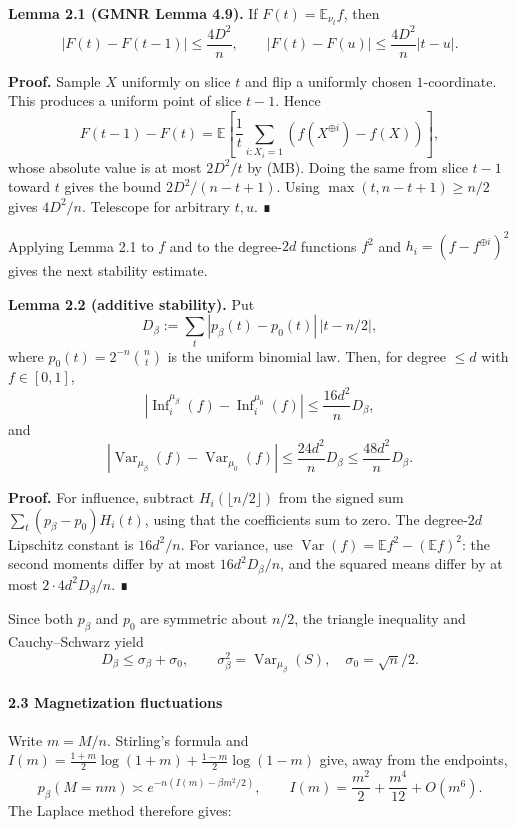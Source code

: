 \textbf{Lemma 2.1 (GMNR Lemma 4.9).} If \(F(t)=\mathbb E_{\nu_t}f\), then
\[|F(t)-F(t-1)|\le\frac{4D^2}{n},
\qquad |F(t)-F(u)|\le\frac{4D^2}{n}|t-u|.\]

\textbf{Proof.} Sample \(X\) uniformly on slice \(t\) and flip a uniformly chosen \(1\)-coordinate. This produces a uniform point of slice \(t-1\). Hence
\[F(t-1)-F(t)=\mathbb E\!\left[\frac1t\sum_{i:X_i=1}(f(X^{\oplus i})-f(X))\right],\]
whose absolute value is at most \(2D^2/t\) by (MB). Doing the same from slice \(t-1\) toward \(t\) gives the bound \(2D^2/(n-t+1)\). Using \(\max(t,n-t+1)\ge n/2\) gives \(4D^2/n\). Telescope for arbitrary \(t,u\). ∎

Applying Lemma 2.1 to \(f\) and to the degree-\(2d\) functions \(f^2\) and \(h_i=(f-f^{\oplus i})^2\) gives the next stability estimate.

\textbf{Lemma 2.2 (additive stability).} Put
\[D_\beta:=\sum_t|p_\beta(t)-p_0(t)|\,|t-n/2|,\]
where \(p_0(t)=2^{-n}\binom nt\) is the uniform binomial law. Then, for degree \(\le d\) with \(f\in[0,1]\),
\[
|\operatorname{Inf}_i^{\mu_\beta}(f)-\operatorname{Inf}_i^{\mu_0}(f)|
\le\frac{16d^2}{n}D_\beta,
\]
and
\[
|\operatorname{Var}_{\mu_\beta}(f)-\operatorname{Var}_{\mu_0}(f)|
\le\frac{24d^2}{n}D_\beta
\le\frac{48d^2}{n}D_\beta.
\]

\textbf{Proof.} For influence, subtract \(H_i(\lfloor n/2\rfloor)\) from the signed sum \(\sum_t(p_\beta-p_0)H_i(t)\), using that the coefficients sum to zero. The degree-\(2d\) Lipschitz constant is \(16d^2/n\). For variance, use \(\operatorname{Var}(f)=\mathbb E f^2-(\mathbb E f)^2\): the second moments differ by at most \(16d^2D_\beta/n\), and the squared means differ by at most \(2\cdot4d^2D_\beta/n\). ∎

Since both \(p_\beta\) and \(p_0\) are symmetric about \(n/2\), the triangle inequality and Cauchy--Schwarz yield
\[
D_\beta\le\sigma_\beta+\sigma_0,
\qquad \sigma_\beta^2=\operatorname{Var}_{\mu_\beta}(S),
\quad \sigma_0=\sqrt n/2. \tag{D-bound}
\]

\paragraph{2.3 Magnetization fluctuations}\label{magnetization-fluctuations}

Write \(m=M/n\). Stirling's formula and \(I(m)=\frac{1+m}{2}\log(1+m)+\frac{1-m}{2}\log(1-m)\) give, away from the endpoints,
\[p_\beta(M=nm)\asymp e^{-n(I(m)-\beta m^2/2)},\qquad
I(m)=\frac{m^2}{2}+\frac{m^4}{12}+O(m^6).\]
The Laplace method therefore gives:

